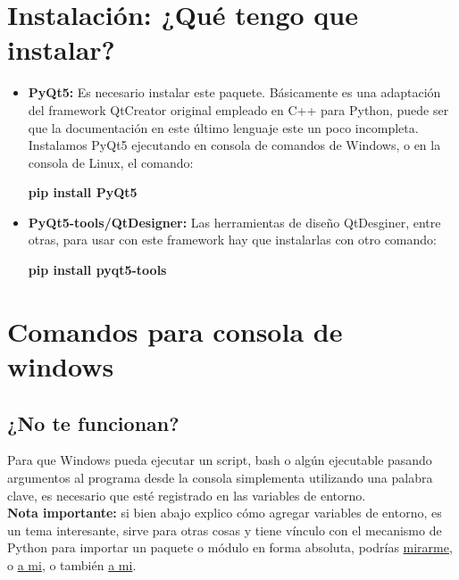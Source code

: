\section{Instalaci\'on: ¿Qu\'e tengo que instalar?}
\begin{itemize}
    \item \textbf{PyQt5:} Es necesario instalar este paquete. B\'asicamente es una adaptaci\'on del framework QtCreator original empleado en C++ para Python, puede ser que la documentaci\'on en este \'ultimo lenguaje este un poco incompleta.
    Instalamos PyQt5 ejecutando en consola de comandos de Windows, o en la consola de Linux, el comando:
    \begin{center}
        \textbf{pip install PyQt5}
    \end{center}

    \item \textbf{PyQt5-tools/QtDesigner:} Las herramientas de dise\~no QtDesginer, entre otras, para usar con este framework hay que instalarlas con otro comando:
    \begin{center}
        \textbf{pip install pyqt5-tools}
    \end{center}
\end{itemize}

\section{Comandos para consola de windows}

\subsection{¿No te funcionan?}
\label{error_de_consola}
Para que Windows pueda ejecutar un script, bash o alg\'un ejecutable pasando argumentos al programa desde la consola simplementa utilizando una palabra clave, es necesario
que est\'e registrado en las variables de entorno. 
\\
\textbf{Nota importante:} si bien abajo explico c\'omo agregar variables de entorno, es un tema interesante, sirve para otras cosas y tiene v\'inculo con el mecanismo de Python
para importar un paquete o m\'odulo en forma absoluta, podr\'ias \href{https://rootear.com/windows/variable-entorno-windows}{mirarme}, o \href{https://es.ccm.net/contents/652-variables-de-entorno}{a mi}, o tambi\'en \href{https://norfipc.com/inf/variables-entorno.html}{a mi}.


